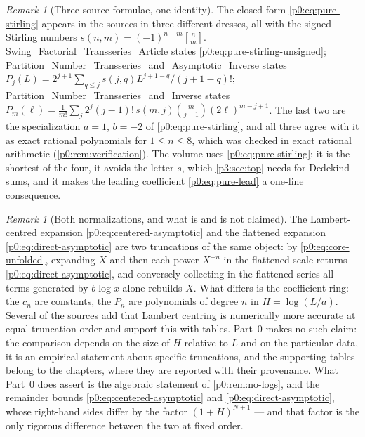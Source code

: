 \documentclass[11pt,a4paper,oneside]{book}
\theoremstyle{plain}
\theoremstyle{definition}
\theoremstyle{remark}
\newtheorem{remark}[theorem]{Remark}
\newcommand{\stirlingfirst}[2]{\genfrac{[}{]}{0pt}{}{#1}{#2}}
\begin{document}
\begin{remark}[Three source formulae, one identity]\label{p0:rem:stirling-crosswalk}
The closed form \eqref{p0:eq:pure-stirling} appears in the sources in three
different dresses, all with the signed Stirling numbers
$s(n,m)=(-1)^{n-m}\stirlingfirst{n}{m}$.
\textsf{Swing\_Factorial\_Transseries\_Article} states
\eqref{p0:eq:pure-stirling-unsigned};
\textsf{Partition\_Number\_Transseries\_and\_Asymptotic\_Inverse} states
$P_j(L)=2^{j+1}\sum_{q\le j}s(j,q)L^{j+1-q}/(j+1-q)!$;
\textsf{Partition\_Number\_Transseries\_and\_Inverse} states
$P_m(\ell)=\frac1{m!}\sum_j2^j(j-1)!\,s(m,j)\binom m{j-1}(2\ell)^{m-j+1}$.
The last two are the specialization $a=1$, $b=-2$ of
\eqref{p0:eq:pure-stirling}, and all three agree with it as exact rational
polynomials for $1\le n\le8$, which was checked in exact rational arithmetic
(\cref{p0:rem:verification}).  The volume uses
\eqref{p0:eq:pure-stirling}: it is the shortest of the four, it avoids the
letter $s$, which \cref{p3:sec:top} needs for Dedekind sums, and it makes the
leading coefficient \eqref{p0:eq:pure-lead} a one-line consequence.
\end{remark}

\begin{remark}[Both normalizations, and what is and is not claimed]
\label{p0:rem:accuracy-claim}
The Lambert-centred expansion \eqref{p0:eq:centered-asymptotic} and the
flattened expansion \eqref{p0:eq:direct-asymptotic} are two truncations of the
same object: by \eqref{p0:eq:core-unfolded}, expanding $X$ and then each power
$X^{-n}$ in the flattened scale returns \eqref{p0:eq:direct-asymptotic}, and
conversely collecting in the flattened series all terms generated by
$b\log x$ alone rebuilds $X$.  What differs is the coefficient ring: the
$c_n$ are constants, the $P_n$ are polynomials of degree $n$ in
$H=\log(L/a)$.  Several of the sources add that Lambert centring is
numerically more accurate at equal truncation order and support this with
tables.  Part~0 makes no such claim: the comparison depends on the size of $H$
relative to $L$ and on the particular data, it is an empirical statement about
specific truncations, and the supporting tables belong to the chapters, where
they are reported with their provenance.  What Part~0 does assert is the
algebraic statement of \cref{p0:rem:no-logs}, and the remainder bounds
\eqref{p0:eq:centered-asymptotic} and \eqref{p0:eq:direct-asymptotic}, whose
right-hand sides differ by the factor $(1+H)^{N+1}$ --- and that factor is the
only rigorous difference between the two at fixed order.
\end{remark}
\end{document}
